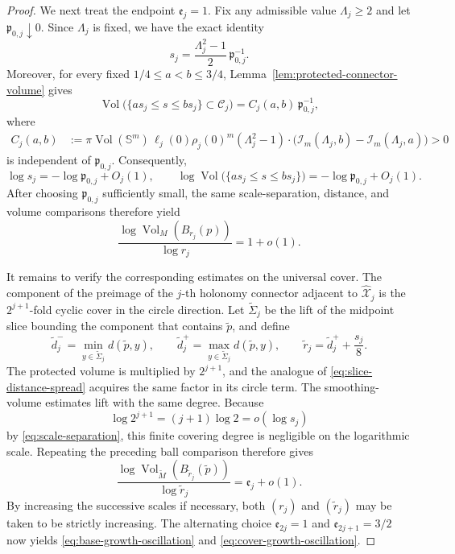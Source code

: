 \documentclass[11pt,reqno]{amsart}
\theoremstyle{definition}
\numberwithin{equation}{section}
\begin{document}
\begin{proof}
We next treat the endpoint \(\mathfrak e_j=1\).  Fix any admissible value
\(\Lambda_j\ge2\) and let \(\mathfrak p_{0,j}\downarrow0\).  Since
\(\Lambda_j\) is fixed, we have the exact identity
\[
 s_j
 =
 \frac{\Lambda_j^2-1}{2}\,
 \mathfrak p_{0,j}^{-1}.
\]
Moreover, for every fixed $1/4\le a<b\le3/4$,
Lemma~\ref{lem:protected-connector-volume} gives
\[
 \operatorname{Vol}\bigl(
 \{a s_j\le s\le b s_j\}\subset\mathcal C_j
 \bigr)
 =
 C_j(a,b)\,\mathfrak p_{0,j}^{-1},
\]
where
\[
 \begin{aligned}
 C_j(a,b)
 &:=
 \pi\operatorname{Vol}(\mathbb S^m)\,
 \ell_j(0)\rho_j(0)^m(\Lambda_j^2-1)\cdot
 \bigl(
 \mathcal I_m(\Lambda_j,b)
 -
 \mathcal I_m(\Lambda_j,a)
 \bigr)>0
\end{aligned}
\]
is independent of \(\mathfrak p_{0,j}\).  Consequently,
\[
 \log s_j
 =
 -\log\mathfrak p_{0,j}+O_j(1),
 \qquad
 \log\operatorname{Vol}\bigl(
 \{a s_j\le s\le b s_j\}
 \bigr)
 =
 -\log\mathfrak p_{0,j}+O_j(1).
\]
After choosing \(\mathfrak p_{0,j}\) sufficiently small, the same
scale-separation, distance, and volume comparisons therefore yield
\[
 \frac{\log\operatorname{Vol}_M(B_{r_j}(p))}
 {\log r_j}
 =1+o(1).
\]


It remains to verify the corresponding estimates on the universal
cover.  The component of the preimage of the \(j\)-th holonomy connector
adjacent to \(\widehat{\mathcal X}_j\) is the \(2^{j+1}\)-fold cyclic
cover in the circle direction.  Let \(\widetilde\Sigma_j\) be the lift
of the midpoint
slice bounding the component that contains \(\widetilde p\), and define
\[
 \widetilde d_j^-=
 \min_{y\in\widetilde\Sigma_j}d(\widetilde p,y),
 \qquad
 \widetilde d_j^+=
 \max_{y\in\widetilde\Sigma_j}d(\widetilde p,y),
 \qquad
 \widetilde r_j=
 \widetilde d_j^++\frac{s_j}{8}.
\]
The protected volume is multiplied by \(2^{j+1}\), and the analogue of
\eqref{eq:slice-distance-spread} acquires the same factor in its circle
term.  The smoothing-volume estimates lift with the same degree.
Because
\[
 \log 2^{j+1}=(j+1)\log2=o(\log s_j)
\]
by \eqref{eq:scale-separation}, this finite covering degree is
negligible on the logarithmic scale.  Repeating the preceding ball
comparison therefore gives
\[
 \frac{\log\operatorname{Vol}_{\widetilde M}
 (B_{\widetilde r_j}(\widetilde p))}
 {\log\widetilde r_j}
 =\mathfrak e_j+o(1).
\]
By increasing the successive scales if necessary, both
\((r_j)\) and \((\widetilde r_j)\) may be taken to be strictly
increasing.  The alternating choice
\(\mathfrak e_{2j}=1\) and \(\mathfrak e_{2j+1}=3/2\) now yields
\eqref{eq:base-growth-oscillation} and
\eqref{eq:cover-growth-oscillation}.
\end{proof}
\end{document}
